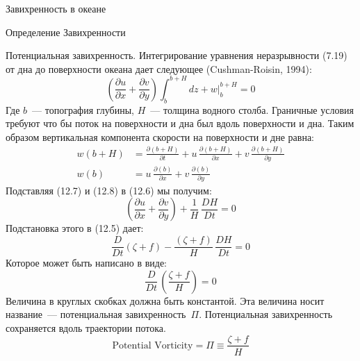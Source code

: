 \begin{chapter}{Завихренность в океане}
\begin{section}{Определение Завихренности}
\begin{paragraph}{Потенциальная завихренность.}
Интегрирование уравнения неразрывности (7.19) от дна до поверхности
океана дает следующее (Cushman-Roisin, 1994):
\begin{equation}
\left( \frac{\partial{u}}{\partial{x}} + \frac{\partial{v}}{\partial{y}}\right) \int_{b}^{b+H} dz + w \bigr|_{b}^{b+H} = 0
\end{equation}
Где $b$~--- топография глубины, $H$~--- толщина водного
столба. Граничные условия требуют что бы поток на поверхности и дна
был вдоль поверхности и дна. Таким образом вертикальная компонента
скорости на поверхности и дне равна:
\begin{align}
w(b+H) &= \frac{\partial{(b+H)}}{\partial{t}} 
          + u\,\frac{\partial{(b+H)}}{\partial{x}}
          + v\, \frac{\partial{(b+H)}}{\partial{y}} \\
w(b)   &= u\,\frac{\partial{(b)}}{\partial{x}}
          + v\,\frac{\partial{(b)}}{\partial{y}}
\end{align}
Подставляя (12.7) и (12.8) в (12.6) мы получим:
\begin{displaymath}
 \left( \frac{\partial{u}}{\partial{x}} 
     + \frac{\partial{v}}{\partial{y}}\right) + \frac{1}{H}\,\frac{DH}{Dt} = 0
\end{displaymath}
Подстановка этого в (12.5) дает:
\begin{displaymath}
\frac{D}{Dt}\left(\zeta +f  \right) -\frac{\left(\zeta +f
\right)}{H}\,\frac{DH}{Dt} = 0
\end{displaymath}
Которое может быть написано в виде:
\begin{displaymath}
\frac{D }{Dt}\,\left( \frac{\zeta + f}{H} \right) = 0
\end{displaymath}
Величина в круглых скобках должна быть константой. Эта величина носит
название~--- потенциальная завихренность~$\Pi$. Потенциальная
завихренность сохраняется вдоль траектории потока.
\begin{equation}
\boxed{\text{Potential Vorticity} = \Pi \equiv \frac{\zeta + f}{H} }
\end{equation}
%

\end{paragraph}
\end{section}
\end{chapter}
